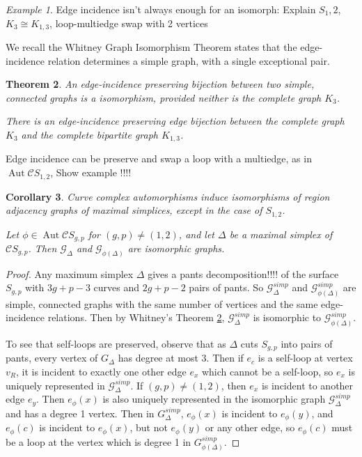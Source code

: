 \documentclass[11pt]{article}
\DeclareMathOperator{\aaut}{Aut}
\newtheorem{theorem}{Theorem}
\newtheorem{corollary}[theorem]{Corollary}
\theoremstyle{remark}
\newtheorem{example}[theorem]{Example}
\theoremstyle{definition}
\begin{document}
\begin{example}
  Edge incidence isn't always enough for an isomorph:
  Explain $S_1,2$, $K_3 \cong K_{1,3}$, loop-multiedge swap with 2 vertices
\end{example}


We recall the Whitney Graph Isomorphism Theorem
\cite{MR1506881}
states that the edge-incidence relation determines a simple graph,
with a single exceptional pair.

\begin{theorem}
  An edge-incidence preserving bijection between two simple, connected graphs
  is a isomorphism, provided neither is the complete graph $K_3$.

  There is an edge-incidence preserving edge bijection between the complete
  graph $K_3$ and the complete bipartite graph $K_{1,3}$.
  \label{thm:whitney}
\end{theorem}

Edge incidence can be preserve and swap a loop with a multiedge,
as in $\aaut \mathcal C S_{1,2}$,
Show example !!!!




\begin{corollary}
  Curve complex automorphisms induce isomorphisms of
  region adjacency graphs of maximal simplices, except in the case of $S_{1,2}$.

  Let $\phi \in \aaut \mathcal C S_{g,p}$ for $(g,p)\neq(1,2)$,
  and let $\Delta$ be a maximal simplex of $\mathcal C S_{g,p}$.
  Then $\mathcal G_\Delta$ and
  $\mathcal G_{\phi(\Delta)}$
  are isomorphic graphs.
  \label{cor:adjgraph}
\end{corollary}

\begin{proof}
  Any maximum simplex $\Delta$
  gives a pants decomposition!!!! of the surface $S_{g,p}$
  with $3g+p-3$ curves and $2g+p-2$ pairs of pants.
  So $\mathcal G^{simp}_\Delta$
  and
  $\mathcal G^{simp}_{\phi(\Delta)}$
  are simple, connected graphs with the same number of
  vertices and the same edge-incidence relations.
  Then by Whitney's Theorem \ref{thm:whitney},
  $\mathcal G^{simp}_\Delta$ is isomorphic to
  $\mathcal G^{simp}_{\phi(\Delta)}$.

  To see that self-loops are preserved, observe
  that as $\Delta$ cuts $S_{g,p}$ into pairs of pants,
  every vertex of $G_\Delta$ has degree at most 3.
  Then if $e_c$ is a self-loop at vertex $v_R$,
  it is incident to exactly one other edge $e_x$
  which cannot be a self-loop, so $e_x$ is uniquely represented in $\mathcal G^{simp}_\Delta$.
  If $(g,p) \neq (1,2)$, then $e_x$ is incident to another edge $e_y$.
  Then $e_\phi(x)$ is
  also uniquely represented in the isomorphic graph $\mathcal G^{simp}_\Delta$
  and has a degree 1 vertex.
  Then in $G^{simp}_\Delta$, $e_\phi(x)$
  is incident to $e_\phi(y)$, and $e_\phi(c)$ is incident to $e_\phi(x)$,
  but not $e_\phi(y)$ or any other edge, so $e_\phi(c)$   must be a loop at the vertex
  which is degree 1 in $G^{simp}_{\phi(\Delta)}$.
\end{proof}
\end{document}
